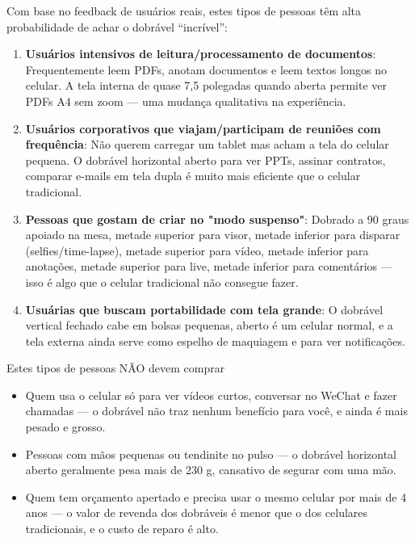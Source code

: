 
Com base no feedback de usuários reais, estes tipos de pessoas têm alta probabilidade de achar o dobrável “incrível”:

\begin{enumerate}
  \item \textbf{Usuários intensivos de leitura/processamento de documentos}: Frequentemente leem PDFs, anotam documentos e leem textos longos no celular. A tela interna de quase 7,5 polegadas quando aberta permite ver PDFs A4 sem zoom — uma mudança qualitativa na experiência.
  \item \textbf{Usuários corporativos que viajam/participam de reuniões com frequência}: Não querem carregar um tablet mas acham a tela do celular pequena. O dobrável horizontal aberto para ver PPTs, assinar contratos, comparar e-mails em tela dupla é muito mais eficiente que o celular tradicional.
  \item \textbf{Pessoas que gostam de criar no "modo suspenso"}: Dobrado a 90 graus apoiado na mesa, metade superior para visor, metade inferior para disparar (selfies/time-lapse), metade superior para vídeo, metade inferior para anotações, metade superior para live, metade inferior para comentários — isso é algo que o celular tradicional não consegue fazer.
  \item \textbf{Usuárias que buscam portabilidade com tela grande}: O dobrável vertical fechado cabe em bolsas pequenas, aberto é um celular normal, e a tela externa ainda serve como espelho de maquiagem e para ver notificações.
\end{enumerate}

\begin{tcbwarn}{Estes tipos de pessoas NÃO devem comprar}
\begin{itemize}
  \item Quem usa o celular só para ver vídeos curtos, conversar no WeChat e fazer chamadas — o dobrável não traz nenhum benefício para você, e ainda é mais pesado e grosso.
  \item Pessoas com mãos pequenas ou tendinite no pulso — o dobrável horizontal aberto geralmente pesa mais de 230 g, cansativo de segurar com uma mão.
  \item Quem tem orçamento apertado e precisa usar o mesmo celular por mais de 4 anos — o valor de revenda dos dobráveis é menor que o dos celulares tradicionais, e o custo de reparo é alto.
\end{itemize}

\end{tcbwarn}

